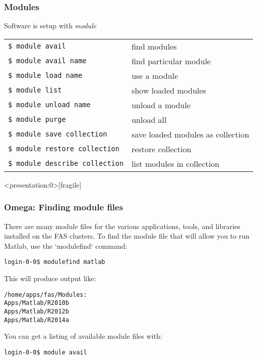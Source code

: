 \documentclass[10pt]{beamer}
\begin{document}
\begin{frame}[fragile]
\frametitle{Modules}

Software is setup with \it{module}

\begin{tabular}{|l|l|}
\hline
\verb+$ module avail + & find modules \\
\verb+$ module avail name+ & find particular module \\
\verb+$ module load name+ & use a module \\
\verb+$ module list+ & show loaded modules \\
\verb+$ module unload name+ & unload a module \\ 
\verb+$ module purge+ & unload all \\
\verb+$ module save collection + & save loaded modules as collection \\
\verb+$ module restore collection+ & restore collection \\
\verb+$ module describe collection+ & list modules in collection \\
\hline
\end{tabular}

\end{frame}

\begin{frame}<presentation:0>[fragile]
\frametitle{Omega: Finding module files}
There are many module files for the various applications, tools, and
libraries installed on the FAS clusters.  To find the module file that
will allow you to run Matlab, use the `modulefind` command:

\begin{verbatim}
login-0-0$ modulefind matlab
\end{verbatim}

This will produce output like:

\begin{verbatim}
/home/apps/fas/Modules:
Apps/Matlab/R2010b
Apps/Matlab/R2012b
Apps/Matlab/R2014a
\end{verbatim}

You can get a listing of available module files with:
\begin{verbatim}
login-0-0$ module avail
\end{verbatim}
\end{frame}
\end{document}
